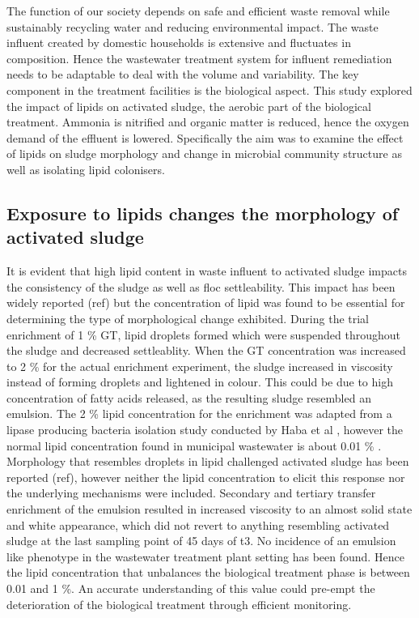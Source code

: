\documentclass[11pt]{article}
\begin{document}
The function of our society depends on safe and efficient waste removal while sustainably recycling water and reducing environmental impact. The waste influent created by domestic households is extensive and fluctuates in composition. Hence the wastewater treatment system for influent remediation needs to be adaptable to deal with the volume and variability. The key component in the treatment facilities is the biological aspect. This study explored the impact of lipids on activated sludge, the aerobic part of the biological treatment. Ammonia is nitrified and organic matter is reduced, hence the oxygen demand of the effluent is lowered. Specifically the aim was to examine the effect of lipids on sludge morphology and change in microbial community structure as well as isolating lipid colonisers.

\subsection{Exposure to lipids changes the morphology of activated sludge}
It is evident that high lipid content in waste influent to activated sludge impacts the consistency of the sludge as well as floc settleability. This impact has been widely reported (ref) but the concentration of lipid was found to be essential for determining the type of morphological change exhibited. During the trial enrichment of 1 \% GT, lipid droplets formed which were suspended throughout the sludge and decreased settleablity. When the GT concentration was increased to 2 \% for the actual enrichment experiment, the sludge increased in viscosity instead of forming droplets and lightened in colour. This could be due to high concentration of fatty acids released, as the resulting sludge resembled an emulsion. The 2 \% lipid concentration for the enrichment was adapted from a lipase producing bacteria isolation study conducted by Haba et al \cite{haba2000isolation}, however the normal lipid concentration found in municipal wastewater is about 0.01 \% \cite{Forster_92}. Morphology that resembles droplets in lipid challenged activated sludge has been reported (ref), however neither the lipid concentration to elicit this response nor the underlying mechanisms were included. Secondary and tertiary transfer enrichment of the emulsion resulted in increased viscosity to an almost solid state and white appearance, which did not revert to anything resembling activated sludge at the last sampling point of 45 days of t3. No incidence of an emulsion like phenotype in the wastewater treatment plant setting has been found. Hence the lipid concentration that unbalances the biological treatment phase is between 0.01 and 1 \%. An accurate understanding of this value could pre-empt the deterioration of the biological treatment through efficient monitoring.
\end{document}
